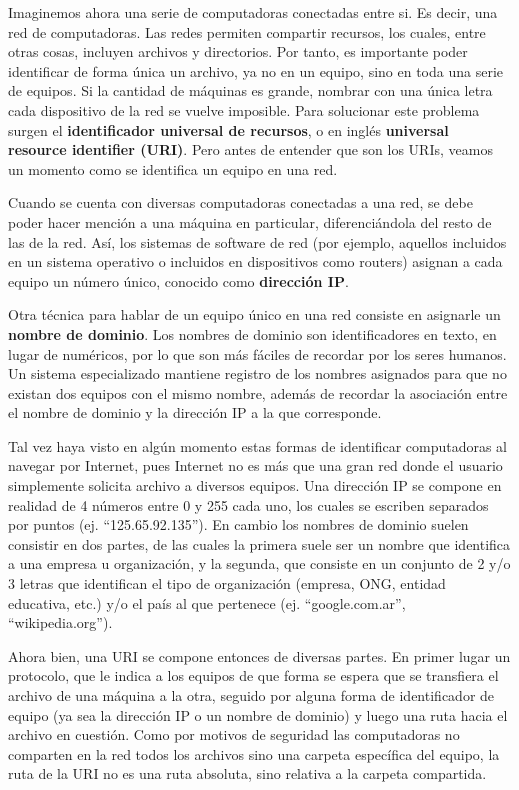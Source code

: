Imaginemos ahora una serie de computadoras conectadas entre si. Es decir, una
red de computadoras. Las redes permiten compartir recursos, los cuales, entre
otras cosas, incluyen archivos y directorios. Por tanto, es importante poder
identificar de forma única un archivo, ya no en un equipo, sino en toda una
serie de equipos. Si la cantidad de máquinas es grande, nombrar con una única
letra cada dispositivo de la red se vuelve imposible. Para solucionar este
problema surgen el \textbf{ identificador universal de recursos}, o en inglés
\textbf{universal resource identifier (URI)}. Pero antes de entender que son los
URIs, veamos un momento como se identifica un equipo en una red.

Cuando se cuenta con diversas computadoras conectadas a una red, se debe poder
hacer mención a una máquina en particular, diferenciándola del resto de las de
la red. Así, los sistemas de software de red (por ejemplo, aquellos incluidos en
un sistema operativo o incluidos en dispositivos como routers) asignan a cada
equipo un número único, conocido como \textbf{dirección IP}.

Otra técnica para hablar de un equipo único en una red consiste en asignarle un
\textbf{nombre de dominio}. Los nombres de dominio son identificadores en texto,
en lugar de numéricos, por lo que son más fáciles de recordar por los seres
humanos. Un sistema especializado mantiene registro de los nombres asignados
para que no existan dos equipos con el mismo nombre, además de recordar la
asociación entre el nombre de dominio y la dirección IP a la que corresponde.

Tal vez haya visto en algún momento estas formas de identificar computadoras al
navegar por Internet, pues Internet no es más que una gran red donde el usuario
simplemente solicita archivo a diversos equipos. Una dirección IP se compone en
realidad de 4 números entre 0 y 255 cada uno, los cuales se escriben separados
por puntos (ej. ``125.65.92.135''). En cambio los nombres de dominio suelen
consistir en dos partes, de las cuales la primera suele ser un nombre que
identifica a una empresa u organización, y la segunda, que consiste en un
conjunto de 2 y/o 3 letras que identifican el tipo de organización (empresa,
ONG, entidad educativa, etc.) y/o el país al que pertenece (ej.
``google.com.ar'', ``wikipedia.org'').

Ahora bien, una URI se compone entonces de diversas partes. En primer lugar un
protocolo, que le indica a los equipos de que forma se espera que se transfiera
el archivo de una máquina a la otra, seguido por alguna forma de identificador
de equipo (ya sea la dirección IP o un nombre de dominio) y luego una ruta hacia
el archivo en cuestión. Como por motivos de seguridad las computadoras no
comparten en la red todos los archivos sino una carpeta específica del equipo,
la ruta de la URI no es una ruta absoluta, sino relativa a la carpeta
compartida.
\autocite{rfc7320_2014}

